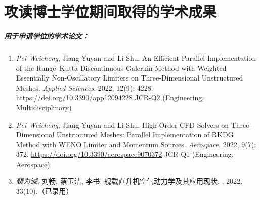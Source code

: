 \documentclass[doctor,openright,twoside,AutoFakeBold=true]{buaathesis}
\theoremstyle{plain}
\theoremstyle{definition}
\theoremstyle{plain}
\theoremstyle{plain}
\theoremstyle{remark}
\theoremstyle{remark}
\theoremstyle{definition}
\theoremstyle{plain}
\theoremstyle{definition}
\theoremstyle{plain}
\theoremstyle{plain}
\theoremstyle{remark}
\theoremstyle{plain}
\theoremstyle{definition}
\theoremstyle{remark}
\theoremstyle{plain}
\theoremstyle{remark}
\theoremstyle{definition}
\theoremstyle{plain}
\theoremstyle{plain}
\theoremstyle{definition}
\theoremstyle{plain}
\theoremstyle{plain}
\theoremstyle{definition}
\begin{document}
\begingroup

\renewcommand\citet[2][]{}
\renewcommand\cite[2][]{}
\renewcommand\upcite[2][]{}

\cleardoublepage
{}
{}
\listoffigures

\cleardoublepage
{}
{}
\listoftables

\endgroup
\printnomenclature

\mainmatter
\pagestyle{mainmatter}



\cleardoublepage
{}
{}

\cleardoublepage

\appendix


\backmatter

\chapter{攻读博士学位期间取得的学术成果}
\paragraph*{用于申请学位的学术论文：}
\begin{enumerate}
\item
\emph{Pei Weicheng}, Jiang Yuyan and Li Shu. An Efficient Parallel Implementation of the Runge–Kutta Discontinuous Galerkin Method with Weighted Essentially Non-Oscillatory Limiters on Three-Dimensional Unstructured Meshes. \textit{Applied Sciences}, 2022, 12(9): 4228.
\url{https://doi.org/10.3390/app12094228} JCR-Q2 (Engineering, Multidisciplinary)

\item
\emph{Pei Weicheng}, Jiang Yuyan and Li Shu. High-Order CFD Solvers on Three-Dimensional Unstructured Meshes: Parallel Implementation of RKDG Method with WENO Limiter and Momentum Sources. \textit{Aerospace}, 2022, 9(7): 372.
\url{https://doi.org/10.3390/aerospace9070372} JCR-Q1 (Engineering, Aerospace)

\item
\emph{裴为诚}, 刘畅, 蔡玉洁, 李书. 舰载直升机空气动力学及其应用现状. , 2022, 33(10).（已录用）
\end{enumerate}
\end{document}
